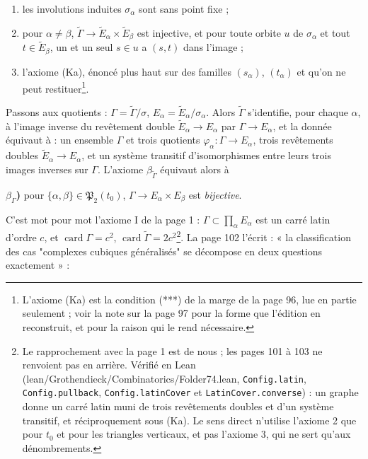 \documentclass[11pt,a4paper]{article}
\begin{document}
\begin{enumerate}
\item[$\alpha$)] les involutions induites $\sigma_\alpha$ sont sans point fixe ;
\item[$\beta_{\widetilde\Gamma}$)] pour $\alpha \neq \beta$, $\widetilde\Gamma
  \to \widetilde E_\alpha \times \widetilde E_\beta$ est injective, et pour toute
  orbite $u$ de $\sigma_\alpha$ et tout $t \in \widetilde E_\beta$, un et un seul
  $s \in u$ a $(s, t)$ dans l'image ;
\item[$\gamma$)] l'axiome (Ka), énoncé plus haut sur des familles $(s_\alpha)$,
  $(t_\alpha)$ et qu'on ne peut restituer\footnote{L'axiome (Ka) est la condition
  (***) de la marge de la page 96, lue en partie seulement ; voir la note sur
  la page 97 pour la forme que l'édition en reconstruit, et pour la raison qui
  le rend nécessaire.}.
\end{enumerate}

Passons aux quotients : $\Gamma = \widetilde\Gamma/\sigma$, $E_\alpha =
\widetilde E_\alpha/\sigma_\alpha$. Alors $\widetilde\Gamma$ s'identifie, pour
chaque $\alpha$, à l'image inverse du revêtement double $\widetilde E_\alpha \to
E_\alpha$ par $\Gamma \to E_\alpha$, et la donnée équivaut à : un ensemble
$\Gamma$ et trois quotients $\varphi_\alpha : \Gamma \to E_\alpha$, trois
revêtements doubles $\widetilde E_\alpha \to E_\alpha$, et un système transitif
d'isomorphismes entre leurs trois images inverses sur $\Gamma$. L'axiome
$\beta_{\widetilde\Gamma}$ équivaut alors à

\textbf{$\beta_\Gamma$)} pour $\lbrace \alpha, \beta\rbrace \in \mathfrak{P}_2(t_0)$,
$\Gamma \to E_\alpha \times E_\beta$ est \emph{bijective}.

C'est mot pour mot l'axiome I de la page 1 : $\Gamma \subset \prod_\alpha
E_\alpha$ est un carré latin d'ordre $c$, et $\operatorname{card}\Gamma = c^2$,
$\operatorname{card}\widetilde\Gamma = 2c^2$\footnote{Le rapprochement avec la
page 1 est de nous ; les pages 101 à 103 ne renvoient pas en arrière. Vérifié
en Lean (lean/Grothendieck/Combinatorics/Folder74.lean, \texttt{Config.latin},
\texttt{Config.pullback}, \texttt{Config.latinCover} et
\texttt{LatinCover.converse}) : un graphe donne un carré latin muni de trois
revêtements doubles et d'un système transitif, et réciproquement sous (Ka). Le
sens direct n'utilise l'axiome 2 que pour $t_0$ et pour les triangles
verticaux, et pas l'axiome 3, qui ne sert qu'aux dénombrements.}. La page
102 l'écrit : « la classification des cas "complexes cubiques généralisés" se
décompose en deux questions exactement » :
\end{document}
